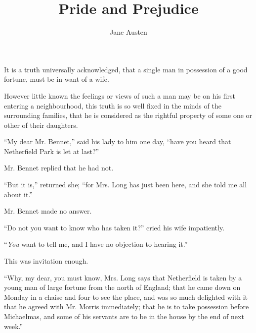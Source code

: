 \newenvironment{letter}{

\strut

}{

\strut

}

\newcommand{\LetterDate}[1]{
\vbox{\strut\itshape\small\raggedleft #1}
}

\newcommand{\LetterSig}[1]{
\vbox{\strut\scshape\raggedleft #1}
}

\frenchspacing

\frontmatter
\title{Pride and Prejudice}
\author{Jane Austen}
\date{}

\maketitle
\tableofcontents

\mainmatter
{}


It is a truth universally acknowledged, that a single man
in possession of a good fortune, must be in want of a wife.

However little known the feelings or views of such a
man may be on his first entering a neighbourhood, this
truth is so well fixed in the minds of the surrounding
families, that he is considered as the rightful property of
some one or other of their daughters.

“My dear Mr. Bennet,” said his lady to him one day,
“have you heard that Netherfield Park is let at last?”

Mr. Bennet replied that he had not.

“But it is,” returned she; “for Mrs. Long has just
been here, and she told me all about it.”

Mr. Bennet made no answer.

“Do not you want to know who has taken it?” cried
his wife impatiently.

“\textit{You} want to tell me, and I have no objection to
hearing it.”

This was invitation enough.

“Why, my dear, you must know, Mrs. Long says that
Netherfield is taken by a young man of large fortune from
the north of England; that he came down on Monday
in a chaise and four to see the place, and was so much
delighted with it that he agreed with Mr. Morris immediately;
that he is to take possession before Michaelmas,
and some of his servants are to be in the house by the end
of next week.”

